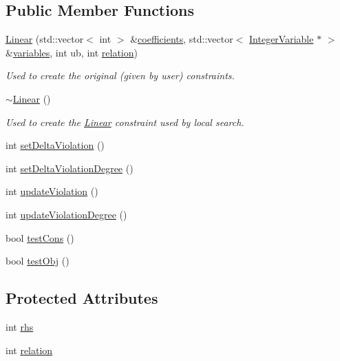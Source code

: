 \subsection*{Public Member Functions}
\begin{DoxyCompactItemize}
\item 
\hyperlink{class_linear_a4e7a378e3e338a36505d0ac001f46f16}{Linear} (std\-::vector$<$ int $>$ \&\hyperlink{class_constraint_a976da5d8a1e74efb119f47094b721df9}{coefficients}, std\-::vector$<$ \hyperlink{class_integer_variable}{Integer\-Variable} $\ast$ $>$ \&\hyperlink{class_constraint_abd73767b8640c514f582a9316a1ce792}{variables}, int ub, int \hyperlink{class_linear_a0c01f7a40f3e0ed8d6466058da3c2e09}{relation})
\begin{DoxyCompactList}\small\item\em Used to create the original (given by user) constraints. \end{DoxyCompactList}\item 
\hyperlink{class_linear_a6abe6c2b55a1e1c3e838aaf82e77e627}{$\sim$\-Linear} ()
\begin{DoxyCompactList}\small\item\em Used to create the \hyperlink{class_linear}{Linear} constraint used by local search. \end{DoxyCompactList}\item 
int \hyperlink{class_linear_aedc905d17bf15995d165e2a4be4c4bd7}{set\-Delta\-Violation} ()
\item 
int \hyperlink{class_linear_a18a38d26f82871299834fbf7b5fdfbf2}{set\-Delta\-Violation\-Degree} ()
\item 
int \hyperlink{class_linear_ae51920a533c6b8e86e07b1c1d37c05fd}{update\-Violation} ()
\item 
int \hyperlink{class_linear_a21831311c105f308c01fa371a2f8fec7}{update\-Violation\-Degree} ()
\item 
bool \hyperlink{class_linear_af8bb974adb2e4d510f325d4865dc5272}{test\-Cons} ()
\item 
bool \hyperlink{class_linear_a84cb459a43191d04406b756117ff8eef}{test\-Obj} ()
\end{DoxyCompactItemize}
\subsection*{Protected Attributes}
\begin{DoxyCompactItemize}
\item 
int \hyperlink{class_linear_a1c5f6c022a68b273fadc1d16f0c431b0}{rhs}
\item 
int \hyperlink{class_linear_a0c01f7a40f3e0ed8d6466058da3c2e09}{relation}
\end{DoxyCompactItemize}



